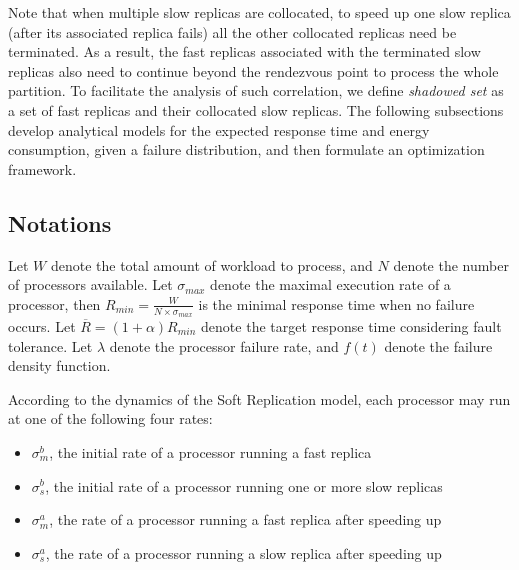Note that when multiple slow replicas are collocated, to speed up one slow replica (after its associated replica fails) all the other collocated replicas need be terminated. As a result, the fast replicas associated with the terminated slow replicas also need to continue beyond the rendezvous point to process the whole partition. To facilitate the analysis of such correlation, we define \textit{shadowed set} as a set of fast replicas and their collocated slow replicas. The following subsections develop analytical models for the expected response time and energy consumption, given a failure distribution, and then formulate an optimization framework. 

\subsection{Notations}
Let $W$ denote the total amount of workload to process, and $N$ denote the number of processors available. Let $\sigma_{max}$ denote the maximal execution rate of a processor, then $R_{min}=\frac{W}{N \times \sigma_{max}}$ is the minimal response time when no failure occurs. Let $\overline{R}=(1+\alpha)R_{min}$ denote the target response time considering fault tolerance. Let $\lambda$ denote the processor failure rate, and $f(t)$ denote the failure density function. %

According to the dynamics of the Soft Replication model, each processor may run at one of the following four rates:
\begin{itemize}
	\item $\sigma_{m}^{b}$, the initial rate of a processor running a fast replica
    \item $\sigma_{s}^{b}$, the initial rate of a processor running one or more slow replicas
    \item $\sigma_{m}^{a}$, the rate of a processor running a fast replica after speeding up
    \item $\sigma_{s}^{a}$, the rate of a processor running a slow replica after speeding up
\end{itemize}

